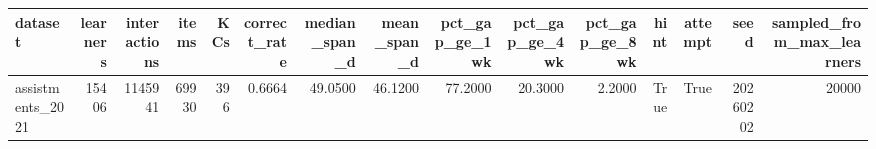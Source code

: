 \begin{tabular}{lrrrrrrrrrrrrrr}
\toprule
dataset & learners & interactions & items & KCs & correct\_rate & median\_span\_d & mean\_span\_d & pct\_gap\_ge\_1wk & pct\_gap\_ge\_4wk & pct\_gap\_ge\_8wk & hint & attempt & seed & sampled\_from\_max\_learners \\
\midrule
assistments\_2021 & 15406 & 1145941 & 69930 & 396 & 0.6664 & 49.0500 & 46.1200 & 77.2000 & 20.3000 & 2.2000 & True & True & 20260202 & 20000 \\
\bottomrule
\end{tabular}
